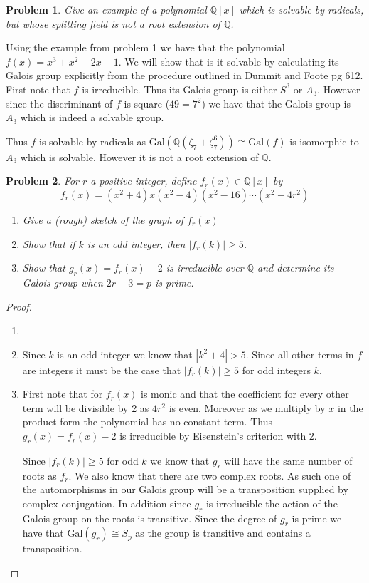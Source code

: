 \documentclass[10pt]{article}
\newcommand{\sk}{\vskip 10mm}
\newcommand{\bb}[1]{\mathbb{#1}}
\theoremstyle{plain}
\newtheorem{problem}{Problem}
\theoremstyle{remark}
\begin{document}
\sk

\begin{problem}
  Give an example of a polynomial $\bb{Q}[x]$ which is solvable by radicals,
  but whose splitting field is not a root extension of $\bb{Q}$.
\end{problem}

Using the example from problem 1 we have that the polynomial
$f(x)=x^3+x^2-2x-1$. We will show that is it solvable by calculating its Galois
group explicitly from the procedure outlined in Dummit and Foote pg 612.
First note that $f$ is irreducible. Thus its Galois group is either
$S^3$ or $A_3$. However since the discriminant of $f$ is square ($49=7^2$) we
have that the Galois group is $A_3$ which is indeed a solvable group.

Thus $f$ is solvable by radicals as
$\text{Gal}(\bb{Q}(\zeta_7+\zeta_7^6))\cong\text{Gal}(f)$ is isomorphic to $A_3$ which is
solvable. However it is not a root extension of $\bb{Q}$.

\sk

\begin{problem}
  For $r$ a positive integer, define $f_r(x)\in\bb{Q}[x]$ by
  \[
    f_r(x)=(x^2+4)x(x^2-4)(x^2-16)\cdots(x^2-4r^2)
  \]
  \begin{enumerate}
  \item[(a)] Give a (rough) sketch of the graph of $f_r(x)$
  \item[(b)] Show that if $k$ is an odd integer, then $|f_r(k)|\geq 5$.
  \item[(c)] Show that $g_r(x)=f_r(x)-2$ is irreducible over $\bb{Q}$ and
    determine its Galois group when $2r+3=p$ is prime.
  \end{enumerate}
\end{problem}

\begin{proof}
  \begin{enumerate}
  \item[(a)] \vskip 2in
  \item[(b)] Since $k$ is an odd integer we know that $|k^2+4|>5$. Since
    all other terms in $f$ are integers it must be the case that
    $|f_r(k)|\geq 5$ for odd integers $k$.
  \item[(c)] First note that for $f_r(x)$ is monic and that the coefficient
    for every other term will be divisible by 2 as $4r^2$ is even. Moreover
    as we multiply by $x$ in the product form the polynomial has no constant
    term. Thus $g_r(x)=f_r(x)-2$ is irreducible by Eisenstein's criterion with
    2.

    Since $|f_r(k)|\geq 5$ for odd $k$ we know that $g_r$ will have the same
    number of roots as $f_r$. We also know that there are two complex
    roots. As such one of the automorphisms in our Galois group will
    be a transposition supplied by complex conjugation. In addition since $g_r$
    is irreducible the action of the Galois group on the roots is transitive.
    Since the degree of $g_r$ is prime we have that $\text{Gal}(g_r)\cong S_p$
    as the group is transitive and contains a transposition.
  \end{enumerate}
\end{proof}

\end{document}
